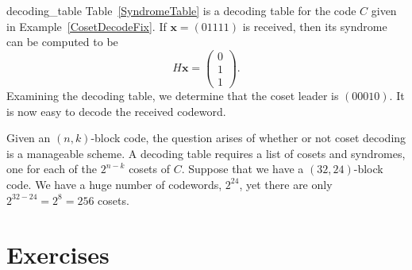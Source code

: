  
\begin{example}{decoding_table}
Table~\ref{SyndromeTable} is a decoding table for the code $C$ given in Example~\ref{CosetDecodeFix}. %
If ${\mathbf x} = (01111)$ is received, then its syndrome can be computed to be
\[
H {\mathbf x} =
\begin{pmatrix}
0 \\ 1 \\ 1
\end{pmatrix}.
\]
Examining the decoding table, we determine that the coset leader is
$(00010)$. It is now easy to decode the received codeword. 
\end{example}
 
 
Given an $(n,k)$-block code, the question arises of whether or not
coset decoding is a manageable scheme.  A decoding table requires a
list of cosets and syndromes, one for each of the $2^{n-k}$ cosets of
$C$.  Suppose that we have a $(32, 24)$-block code.  We have a huge
number of codewords, $2^{24}$, yet there are only $2^{32-24} = 2^{8} =
256$ cosets.  
 

 
 
 
 
\section*{Exercises}
\exrule
 
 
 
